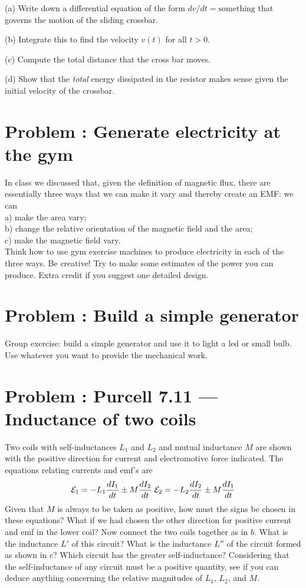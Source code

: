 \documentclass[problems]{esg8022pset}
\begin{document}
\par\noindent (a) Write down a differential equation of the form
$dv/dt = \mbox{something}$ that governs the motion of the sliding
crossbar.

\par\noindent (b) Integrate this to find the velocity $v(t)$ for all
$t > 0$.

\par\noindent (c) Compute the total distance that the cross bar moves.

\par\noindent (d) Show that the {\it total} energy dissipated in the
resistor makes sense given the initial velocity of the crossbar.
\section{Problem \thesection: Generate electricity at the gym}
In class we discussed that, given the definition of magnetic flux, there are essentially three ways that we can make it vary and thereby create an EMF: we can \\
\noindent a) make the area vary;\\
\noindent b) change the relative orientation of the magnetic field and the area; \\
\noindent c) make the magnetic field vary. \\

\noindent Think how to use gym exercise machines to produce electricity in each of the three ways. Be creative!
Try to make some estimates of the power you can produce. Extra credit if you suggest one detailed design.
\section{Problem \thesection: Build a simple generator}
 Group exercise: build a simple generator and use it to light a led or small bulb. Use whatever you want to
  provide the mechanical work.
 
\section{Problem \thesection: Purcell 7.11 --- Inductance of two coils}
Two coils with self-inductances $L_1$ and $L_2$ and mutual inductance $M$  are shown with the positive direction for current and electromotive force indicated. The equations relating currents and emf's are
\begin{equation}
{\cal E}_1 = -L_1\frac{dI_1}{dt}\pm M\frac{dI_2}{dt} \; {\cal E}_2 = -L_2\frac{dI_2}{dt}\pm M\frac{dI_1}{dt}
\end{equation}
Given that $M$ is always to be taken as positive, how must the signs be chosen in these equations? What if we had chosen the other direction for positive current and emf in the lower coil? Now connect the two coils together as in $b$. What is the inductance $L'$ of this circuit? What is the inductance $L''$ of the circuit formed as shown in $c$? Which circuit has the greater self-inductance? Considering that the self-inductance of any circuit must be a positive quantity, see if you can deduce anything concerning the relative magnitudes of $L_1$, $L_2$, and $M$.
\end{document}
